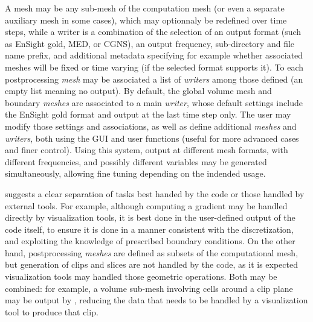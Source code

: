 A mesh may be any sub-mesh of the computation mesh (or even
a separate auxiliary mesh in some cases), which may optionnaly
be redefined over time steps, while a writer is a combination of the
selection of an output format (such as EnSight gold, MED, or CGNS),
an output frequency, sub-directory and file name prefix,
and additional metadata specifying for example whether associated meshes
will be fixed or time varying (if the selected format supports it).
To each postprocessing \emph{mesh} may be associated a list of
\emph{writers} among those defined (an empty list meaning no output).
By default, the global volume mesh and boundary \emph{meshes} are
associated to a main \emph{writer}, whose default settings include the
EnSight gold format and output at the last time step only.
The user may modify those settings and associations, as well as
define additional \emph{meshes} and \emph{writers}, both using
the GUI and user functions (useful for more advanced cases
and finer control).
Using this system, output at different mesh formats, with different
frequencies, and possibly different variables may be generated
simultaneously, allowing fine tuning depending on the indended
usage.

\CS suggests a clear separation of tasks best handed by the code
or those handled by external tools. For example, although computing
a gradient may be handled directly by visualization tools, it is
best done in the user-defined output of the code itself, to ensure
it is done in a manner consistent with the discretization, and
exploiting the knowledge of prescribed boundary conditions.
On the other hand, postprocessing \emph{meshes} are defined as
subsets of the computational mesh, but generation of clips and slices
are not handled by the code, as it is expected visualization tools
may handled those geometric operations. Both may be combined: for example,
a volume sub-mesh involving cells around a clip plane may be output
by \CS, reducing the data that needs to be handled by a visualization
tool to produce that clip.
